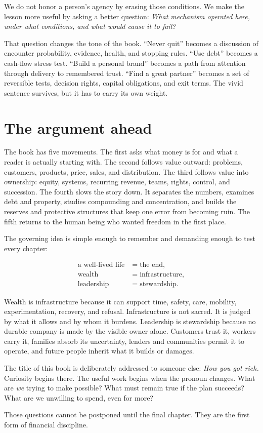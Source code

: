 We do not honor a person's agency by erasing those conditions. We make the
lesson more useful by asking a better question: \emph{What mechanism operated
here, under what conditions, and what would cause it to fail?}

That question changes the tone of the book. ``Never quit'' becomes a discussion
of encounter probability, evidence, health, and stopping rules. ``Use debt''
becomes a cash-flow stress test. ``Build a personal brand'' becomes a path from
attention through delivery to remembered trust. ``Find a great partner''
becomes a set of reversible tests, decision rights, capital obligations, and
exit terms. The vivid sentence survives, but it has to carry its own weight.

\section*{The argument ahead}

The book has five movements. The first asks what money is for and what a reader
is actually starting with. The second follows value outward: problems,
customers, products, price, sales, and distribution. The third follows value
into ownership: equity, systems, recurring revenue, teams, rights, control, and
succession. The fourth slows the story down. It separates the numbers, examines
debt and property, studies compounding and concentration, and builds the
reserves and protective structures that keep one error from becoming ruin. The
fifth returns to the human being who wanted freedom in the first place.

The governing idea is simple enough to remember and demanding enough to test
every chapter:

\begin{equation}
\begin{aligned}
\text{a well-lived life}&=\text{the end},\\
\text{wealth}&=\text{infrastructure},\\
\text{leadership}&=\text{stewardship}.
\end{aligned}
\end{equation}

Wealth is infrastructure because it can support time, safety, care, mobility,
experimentation, recovery, and refusal. Infrastructure is not sacred. It is
judged by what it allows and by whom it burdens. Leadership is stewardship
because no durable company is made by the visible owner alone. Customers trust
it, workers carry it, families absorb its uncertainty, lenders and communities
permit it to operate, and future people inherit what it builds or damages.

The title of this book is deliberately addressed to someone else: \emph{How
you got rich.} Curiosity begins there. The useful work begins when the pronoun
changes. What are \emph{we} trying to make possible? What must remain true if
the plan succeeds? What are we unwilling to spend, even for more?

Those questions cannot be postponed until the final chapter. They are the
first form of financial discipline.
